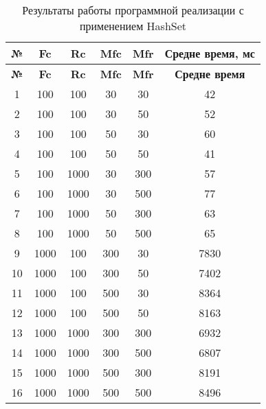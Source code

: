 \begin{longtable}{|c|c|c|c|c|c|}
    \caption{Результаты работы программной реализации с применением HashSet}
    \label{tab:hashset}\\   
    \hline
    \bfseries{№} & \bfseries{Fc} & \bfseries{Rc} & \bfseries{Mfc} & \bfseries{Mfr} & \bfseries{Средне время, мс} \\
    \hline
    \endfirsthead
    \hline
    \bfseries{№} & \bfseries{Fc} & \bfseries{Rc} & \bfseries{Mfc} & \bfseries{Mfr} & \bfseries{Средне время} \\
    \hline
    \endhead
    \hline
    1 & 100 & 100 & 30 & 30 & 42 \\
    \hline
    2 & 100 & 100 & 30 & 50 & 52 \\
    \hline
    3 & 100 & 100 & 50 & 30 & 60 \\
    \hline
    4 & 100 & 100 & 50 & 50 & 41 \\
    \hline
    5 & 100 & 1000 & 30 & 300 & 57 \\
    \hline
    6 & 100 & 1000 & 30 & 500 & 77 \\
    \hline
    7 & 100 & 1000 & 50 & 300 & 63 \\
    \hline
    8 & 100 & 1000 & 50 & 500 & 65 \\
    \hline
    9 & 1000 & 100 & 300 & 30 & 7830 \\
    \hline
    10 & 1000 & 100 & 300 & 50 & 7402 \\
    \hline
    11 & 1000 & 100 & 500 & 30 & 8364 \\
    \hline
    12 & 1000 & 100 & 500 & 50 & 8163 \\
    \hline
    13 & 1000 & 1000 & 300 & 300 & 6932 \\
    \hline
    14 & 1000 & 1000 & 300 & 500 & 6807 \\
    \hline
    15 & 1000 & 1000 & 500 & 300 & 8191 \\
    \hline
    16 & 1000 & 1000 & 500 & 500 & 8496 \\
    \hline
\end{longtable}

